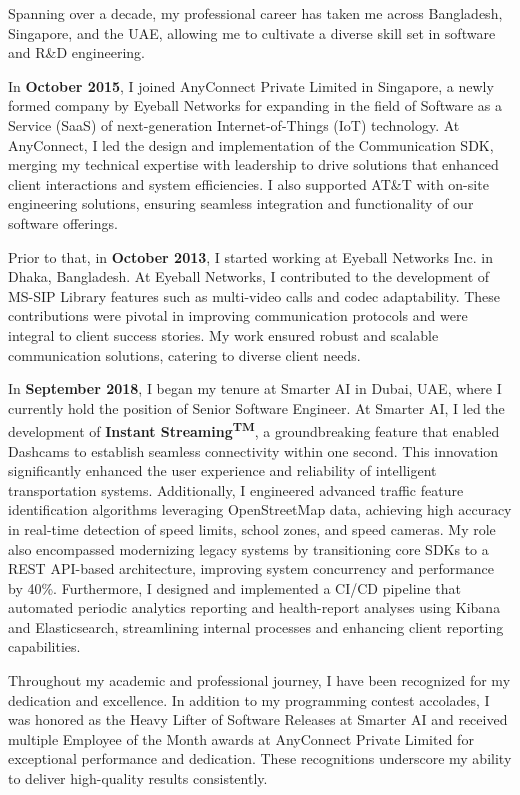 \documentclass[11pt]{article}
\begin{document}
Spanning over a decade, my professional career has taken me across Bangladesh, Singapore, and the UAE,
allowing me to cultivate a diverse skill set in software and R\&D engineering.

In \textbf{October 2015}, I joined AnyConnect Private Limited in Singapore, a newly formed company by Eyeball
Networks for expanding in the field of Software as a Service (SaaS) of next-generation Internet-of-Things
(IoT) technology. At AnyConnect, I led the design and implementation of the Communication SDK,
merging my technical expertise with leadership to drive solutions that enhanced client interactions and
system efficiencies. I also supported AT\&T with on-site engineering solutions, ensuring seamless integration and
functionality of our software offerings.

Prior to that, in \textbf{October 2013}, I started working at Eyeball Networks Inc. in Dhaka, Bangladesh. At
Eyeball Networks, I contributed to the development of MS-SIP Library features such as multi-video calls and
codec adaptability. These contributions were pivotal in improving communication protocols and were integral
to client success stories. My work ensured robust and scalable communication solutions, catering to diverse
client needs.

In \textbf{September 2018}, I began my tenure at Smarter AI in Dubai, UAE, where I currently hold the position
of Senior Software Engineer. At Smarter AI, I led the development of \textbf{Instant Streaming\textsuperscript{TM}},
a groundbreaking feature that enabled Dashcams to establish seamless connectivity within one second. This
innovation significantly enhanced the user experience and reliability of intelligent transportation systems.
Additionally, I engineered advanced traffic feature identification algorithms leveraging OpenStreetMap data,
achieving high accuracy in real-time detection of speed limits, school zones, and speed cameras. My role also
encompassed modernizing legacy systems by transitioning core SDKs to a REST API-based architecture,
improving system concurrency and performance by 40\%. Furthermore, I designed and implemented a CI/CD pipeline
that automated periodic analytics reporting and health-report analyses using Kibana and Elasticsearch,
streamlining internal processes and enhancing client reporting capabilities.

Throughout my academic and professional journey, I have been recognized for my dedication and excellence.
In addition to my programming contest accolades, I was honored as the Heavy Lifter of Software Releases at
Smarter AI and received multiple Employee of the Month awards at AnyConnect Private Limited for exceptional
performance and dedication. These recognitions underscore my ability to deliver high-quality results consistently.
\end{document}
